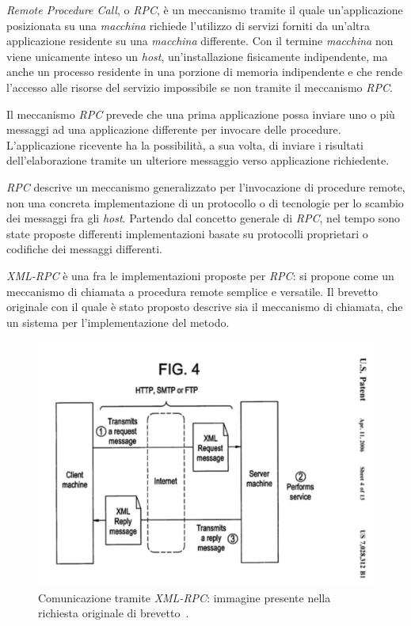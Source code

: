 \emph{Remote Procedure Call}, o \emph{RPC}, è un meccanismo tramite il quale un'applicazione posizionata su una \emph{macchina} richiede l'utilizzo di servizi forniti da un'altra applicazione residente su una \emph{macchina} differente. Con il termine \emph{macchina} non viene unicamente inteso un \emph{host}, un'installazione fisicamente indipendente, ma anche un processo residente in una porzione di memoria indipendente e che rende l'accesso alle risorse del servizio impossibile se non tramite il meccanismo \emph{RPC}. 

Il meccanismo \emph{RPC} prevede che una prima applicazione possa inviare uno o più messaggi ad una applicazione differente per invocare delle procedure. L'applicazione ricevente ha la possibilità,  a sua volta, di inviare i risultati dell'elaborazione tramite un ulteriore messaggio verso applicazione richiedente.~\cite{MERRICK:2006:misc}

\emph{RPC} descrive un meccanismo generalizzato per l'invocazione di procedure remote, non una concreta implementazione di un protocollo o di tecnologie per lo scambio dei messaggi fra gli \emph{host}. Partendo dal concetto generale di \emph{RPC}, nel tempo sono state proposte differenti implementazioni basate su protocolli proprietari o codifiche dei messaggi differenti.~\cite{JAIRATH:2004:misc}~\cite{dcerpc}

\emph{XML-RPC} è una fra le implementazioni proposte per \emph{RPC}: si propone come un meccanismo di chiamata a procedura remote semplice e versatile. Il brevetto originale con il quale è stato proposto descrive sia il meccanismo di chiamata, che un sistema per l'implementazione del metodo.~\cite{MERRICK:2006:misc}

\begin{figure}[h]
\centering
\includegraphics[scale=0.5, viewport=0 0 646 440]{Immagini/Capitolo2/XMLRPC-patent.pdf}
\caption[Comunicazione tramite \emph{XML-RPC}]{Comunicazione tramite \emph{XML-RPC}: immagine presente nella richiesta originale di brevetto~\cite{MERRICK:2006:misc}.}\label{fig:xmlrpc-patent}
\end{figure}

